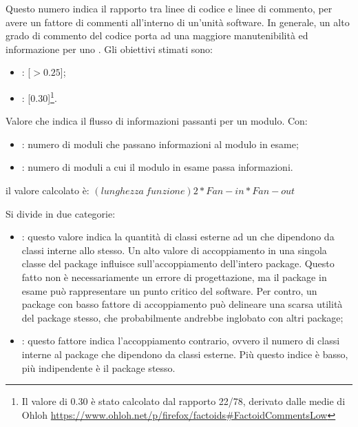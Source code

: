 \label{4.2.5}
Questo numero indica il rapporto tra linee di codice e linee di commento, per avere un fattore di commenti all'interno di un'unità software. In generale, un alto grado di commento del codice porta ad una maggiore manutenibilità ed informazione per uno .
Gli obiettivi stimati sono:
\begin{itemize}
\item {}: [$>0.25$];
\item {}: [0.30]\footnote{Il valore di 0.30 è stato calcolato dal rapporto 22/78, derivato dalle medie di Ohloh \url{https://www.ohloh.net/p/firefox/factoids\#FactoidCommentsLow}}.
\end{itemize}

\label{4.2.6}
Valore che indica il flusso di informazioni passanti per un modulo.
Con:
\begin{itemize}
\item {}: numero di moduli che passano informazioni al modulo in esame;
\item {}: numero di moduli a cui il modulo in esame passa informazioni.
\end{itemize}
il valore calcolato è:
\begin{math}(lunghezza\:funzione)2 * Fan-in * Fan-out\end{math}

\label{4.2.7}
Si divide in due categorie:
\begin{itemize}
\item {}: questo valore indica la quantità di classi esterne ad un  che dipendono da classi interne allo stesso.
Un alto valore di accoppiamento in una singola classe del package influisce sull'accoppiamento dell'intero package. Questo fatto non è necessariamente un errore di progettazione, ma il package in esame può rappresentare un punto critico del software. Per contro, un package con basso fattore di accoppiamento può delineare una scarsa utilità del package stesso, che probabilmente andrebbe inglobato con altri package;
\item {}: questo fattore indica l'accoppiamento contrario, ovvero il numero di classi interne al package che dipendono da classi esterne. Più questo indice è basso, più indipendente è il package stesso.
\end{itemize}

